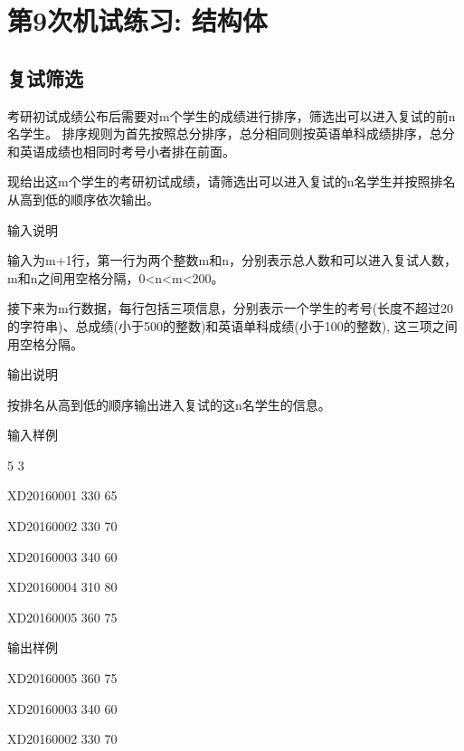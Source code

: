 %
%
%
\chapter{第9次机试练习: 结构体}

\section{复试筛选}	
考研初试成绩公布后需要对m个学生的成绩进行排序，筛选出可以进入复试的前n名学生。
排序规则为首先按照总分排序，总分相同则按英语单科成绩排序，总分和英语成绩也相同时考号小者排在前面。

现给出这m个学生的考研初试成绩，请筛选出可以进入复试的n名学生并按照排名从高到低的顺序依次输出。

输入说明	

输入为m+1行，第一行为两个整数m和n，分别表示总人数和可以进入复试人数，m和n之间用空格分隔，0<n<m<200。

接下来为m行数据，每行包括三项信息，分别表示一个学生的考号(长度不超过20的字符串)、总成绩(小于500的整数)和英语单科成绩(小于100的整数), 这三项之间用空格分隔。

输出说明

按排名从高到低的顺序输出进入复试的这n名学生的信息。

输入样例	

5 3

XD20160001 330 65

XD20160002 330 70

XD20160003 340 60

XD20160004 310 80

XD20160005 360 75

输出样例	

XD20160005 360 75

XD20160003 340 60

XD20160002 330 70

